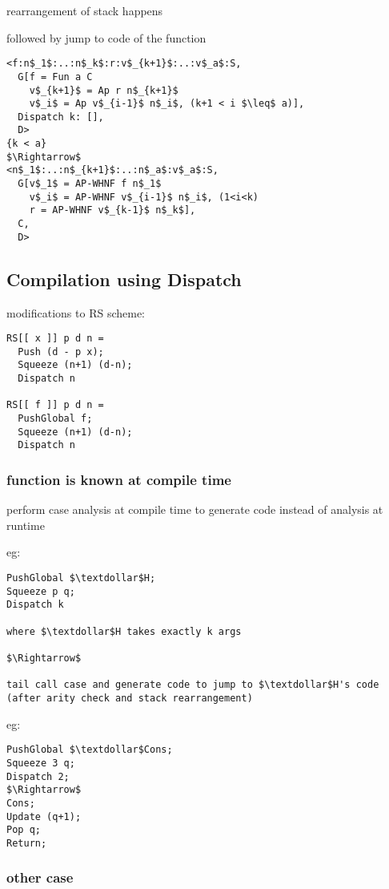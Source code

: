 \documentclass[8pt]{extarticle}
\begin{document}
\begin{multicols*}{2}
rearrangement of stack happens

followed by jump to code of the function

\begin{lstlisting}
<f:n$_1$:..:n$_k$:r:v$_{k+1}$:..:v$_a$:S,
  G[f = Fun a C
    v$_{k+1}$ = Ap r n$_{k+1}$
    v$_i$ = Ap v$_{i-1}$ n$_i$, (k+1 < i $\leq$ a)],
  Dispatch k: [],
  D>
{k < a}
$\Rightarrow$
<n$_1$:..:n$_{k+1}$:..:n$_a$:v$_a$:S,
  G[v$_1$ = AP-WHNF f n$_1$
    v$_i$ = AP-WHNF v$_{i-1}$ n$_i$, (1<i<k)
    r = AP-WHNF v$_{k-1}$ n$_k$],
  C,
  D>
\end{lstlisting}


\subsection{Compilation using Dispatch}

modifications to RS scheme:

\begin{lstlisting}
RS[[ x ]] p d n =
  Push (d - p x);
  Squeeze (n+1) (d-n);
  Dispatch n

RS[[ f ]] p d n =
  PushGlobal f;
  Squeeze (n+1) (d-n);
  Dispatch n
\end{lstlisting}

\subsubsection{function is known at compile time}
perform case analysis at compile time to generate code instead of analysis at runtime

eg:

\begin{lstlisting}
PushGlobal $\textdollar$H;
Squeeze p q;
Dispatch k

where $\textdollar$H takes exactly k args

$\Rightarrow$

tail call case and generate code to jump to $\textdollar$H's code
(after arity check and stack rearrangement)
\end{lstlisting}


eg:
\begin{lstlisting}
PushGlobal $\textdollar$Cons;
Squeeze 3 q;
Dispatch 2;
$\Rightarrow$
Cons;
Update (q+1);
Pop q;
Return;
\end{lstlisting}

\subsubsection{other case}


\end{multicols*}
\end{document}
